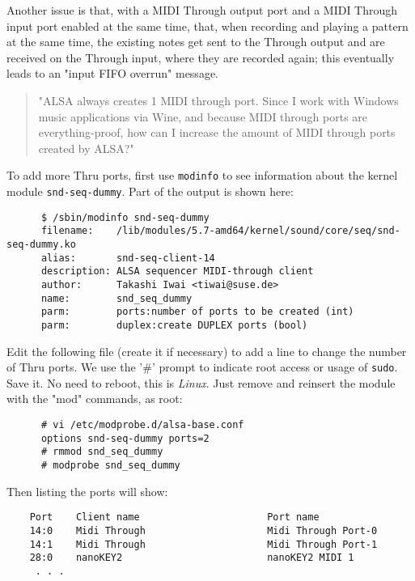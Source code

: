    Another issue is that, with a MIDI Through output port and a MIDI Through
   input port enabled at the same time, that, when recording and playing a
   pattern at the same time, the existing notes get sent to the Through output
   and are received on the Through input, where they are recorded again; this
   eventually leads to an "input FIFO overrun" message.

   \begin{quote}
      "ALSA always creates 1 MIDI through port. Since I work with Windows music
      applications via Wine, and because MIDI through ports are
      everything-proof, how can I increase the amount of MIDI through ports
      created by ALSA?"
   \end{quote}

   To add more Thru ports, first use \texttt{modinfo} to see information about
   the kernel module \texttt{snd-seq-dummy}.  Part of the output is shown here:

   \begin{verbatim}
      $ /sbin/modinfo snd-seq-dummy
      filename:    /lib/modules/5.7-amd64/kernel/sound/core/seq/snd-seq-dummy.ko
      alias:       snd-seq-client-14
      description: ALSA sequencer MIDI-through client
      author:      Takashi Iwai <tiwai@suse.de>
      name:        snd_seq_dummy
      parm:        ports:number of ports to be created (int)
      parm:        duplex:create DUPLEX ports (bool)
   \end{verbatim}

   Edit the following file (create it if necessary)
   to add a line to change the number
   of Thru ports.  We use the '\#' prompt to indicate root access or usage of
   \texttt{sudo}.
   Save it.
   No need to reboot, this is \textsl{Linux}.
   Just remove and reinsert the module with the
   "mod" commands, as root:

   \begin{verbatim}
      # vi /etc/modprobe.d/alsa-base.conf
      options snd-seq-dummy ports=2
      # rmmod snd_seq_dummy
      # modprobe snd_seq_dummy
   \end{verbatim}

   Then listing the ports will show:

   \begin{verbatim}
    Port    Client name                      Port name
    14:0    Midi Through                     Midi Through Port-0
    14:1    Midi Through                     Midi Through Port-1
    28:0    nanoKEY2                         nanoKEY2 MIDI 1
     . . .
   \end{verbatim}

